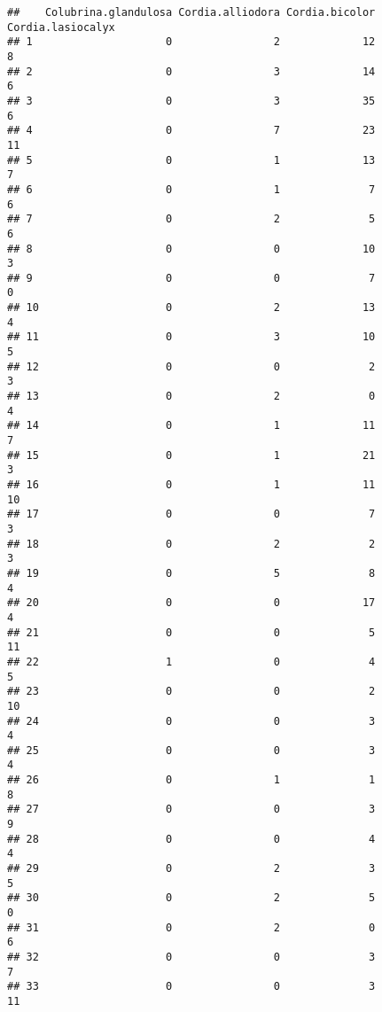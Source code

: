 \documentclass[
]{article}
\begin{document}
\begin{verbatim}
##    Colubrina.glandulosa Cordia.alliodora Cordia.bicolor Cordia.lasiocalyx
## 1                     0                2             12                 8
## 2                     0                3             14                 6
## 3                     0                3             35                 6
## 4                     0                7             23                11
## 5                     0                1             13                 7
## 6                     0                1              7                 6
## 7                     0                2              5                 6
## 8                     0                0             10                 3
## 9                     0                0              7                 0
## 10                    0                2             13                 4
## 11                    0                3             10                 5
## 12                    0                0              2                 3
## 13                    0                2              0                 4
## 14                    0                1             11                 7
## 15                    0                1             21                 3
## 16                    0                1             11                10
## 17                    0                0              7                 3
## 18                    0                2              2                 3
## 19                    0                5              8                 4
## 20                    0                0             17                 4
## 21                    0                0              5                11
## 22                    1                0              4                 5
## 23                    0                0              2                10
## 24                    0                0              3                 4
## 25                    0                0              3                 4
## 26                    0                1              1                 8
## 27                    0                0              3                 9
## 28                    0                0              4                 4
## 29                    0                2              3                 5
## 30                    0                2              5                 0
## 31                    0                2              0                 6
## 32                    0                0              3                 7
## 33                    0                0              3                11

\end{verbatim}
\end{document}
